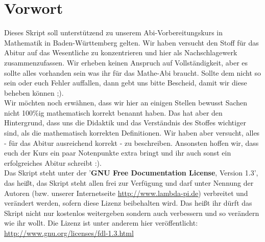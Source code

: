 \chapter*{Vorwort}
	Dieses Skript soll unterstützend zu unserem Abi-Vorbereitungskurs in Mathematik
	in Baden-Württemberg gelten. Wir haben versucht den Stoff für das Abitur auf
	das Wesentliche zu konzentrieren und hier als Nachschlagewerk zusammenzufassen.
	Wir erheben keinen Anspruch auf Vollständigkeit, aber es sollte alles vorhanden
	sein was ihr für das Mathe-Abi braucht. Sollte dem nicht so sein oder euch
	Fehler auffallen, dann gebt uns bitte Bescheid, damit wir diese beheben können
	;).\\
	Wir möchten noch erwähnen, dass wir hier an einigen Stellen bewusst Sachen
	nicht 100\%ig mathematisch korrekt benannt haben. Das hat aber den Hintergrund,
	dass uns die Didaktik und das Verständnis des Stoffes wichtiger sind, als die
	mathematisch korrekten Definitionen. Wir haben aber versucht, alles - für das
	Abitur ausreichend korrekt - zu beschreiben. Ansonsten hoffen wir, dass euch
	der Kurs ein paar Notenpunkte extra bringt und ihr auch sonst ein erfolgreiches
	Abitur schreibt :).\\
	Das Skript steht unter der '\textbf{GNU Free Documentation License}, Version
	1.3', das heißt, das Skript steht allen frei zur Verfügung und darf unter
	Nennung der Autoren (bzw. unserer Internetseite \url{http://www.lambda-pi.de})
	verbreitet und verändert werden, sofern diese Lizenz beibehalten wird. Das
	heißt ihr dürft das Skript nicht nur kostenlos weitergeben sondern auch
	verbessern und so verändern wie ihr wollt. Die Lizenz ist unter anderem hier
	veröffentlicht:\\
	\url{http://www.gnu.org/licenses/fdl-1.3.html}